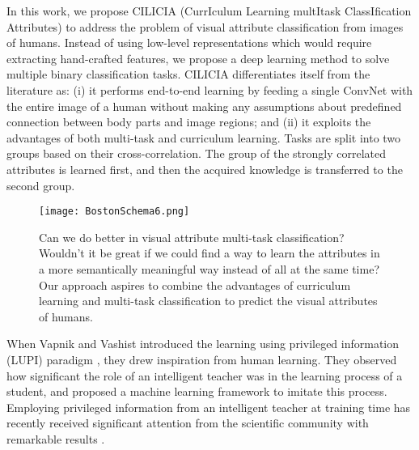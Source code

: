 \documentclass[10pt,twocolumn,letterpaper]{article}
\begin{document}
	In this work, we propose CILICIA (CurrIculum Learning multItask ClassIfication Attributes) to address the problem of visual attribute classification from images of humans. Instead of using low-level representations which would require extracting hand-crafted features, we propose a deep learning method to solve multiple binary classification tasks. CILICIA differentiates itself from the literature as: (i) it performs end-to-end learning by feeding a single ConvNet with the entire image of a human without making any assumptions about predefined connection between body parts and image regions; and (ii) it exploits the advantages of both multi-task and curriculum learning. Tasks are split into two groups based on their cross-correlation. The group of the strongly correlated attributes is learned first, and then the acquired knowledge is transferred to the second group.  
	
	\begin{figure}[t] 
		\centering
		\texttt{[image: BostonSchema6.png]}
		\caption{Can we do better in visual attribute multi-task classification? Wouldn't it be great if we could find a way to learn the attributes in a more semantically meaningful way instead of all at the same time? Our approach aspires to combine the advantages of curriculum learning and multi-task classification to predict the visual attributes of humans.} 
		\label{fig:Boston}
	\end{figure} 
	When Vapnik and Vashist introduced the learning using privileged information (LUPI) paradigm \cite{Vapnik_2009_15070}, they drew inspiration from human learning. They observed how significant the role of an intelligent teacher was in the learning process of a student, and proposed a machine learning framework to imitate this process. Employing privileged information from an intelligent teacher at training time has recently received significant attention from the scientific community with remarkable results \cite{kakadiaris2016show, motiian2016information, sarafianos2016predicting, Sharmanska_2013_16765, MVrigkas_ICIP16, Wang_2015_16756}. 
	
\end{document}
